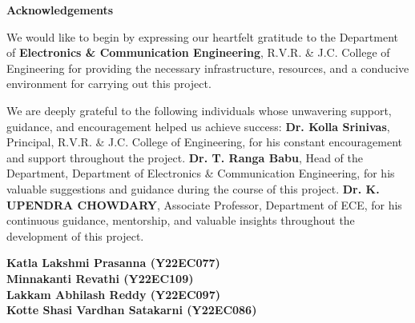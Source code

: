  \begin{center}  \LARGE  \textbf{Acknowledgements}    \end{center}



{%
 We would like to begin by expressing our heartfelt gratitude to the Department of \textbf{Electronics \& Communication Engineering}, R.V.R. \& J.C. College of Engineering for providing the necessary infrastructure, resources, and a conducive environment for
carrying out this project.

}

{%
We are deeply grateful to the following individuals whose unwavering support,
guidance, and encouragement helped us achieve success:
      \textbf{Dr. Kolla Srinivas}, Principal, R.V.R. \& J.C. College of Engineering, for his constant encouragement and support throughout the project.
    \textbf{Dr. T. Ranga Babu}, Head of the Department, Department of Electronics \& Communication Engineering, for his valuable suggestions and guidance during the course of this project.
\textbf{Dr. K. UPENDRA CHOWDARY}, Associate Professor, Department of ECE, for his continuous guidance, mentorship, and valuable insights throughout the development of this project.
    
\vspace{6em}
\begin{flushright}
    \textbf{Katla Lakshmi Prasanna (Y22EC077)}\\[15pt]
    \textbf{Minnakanti Revathi (Y22EC109)}\\[15pt]
    \textbf{Lakkam Abhilash Reddy (Y22EC097)}\\[15pt]
    \textbf{Kotte Shasi Vardhan Satakarni (Y22EC086)}
\end{flushright}
}